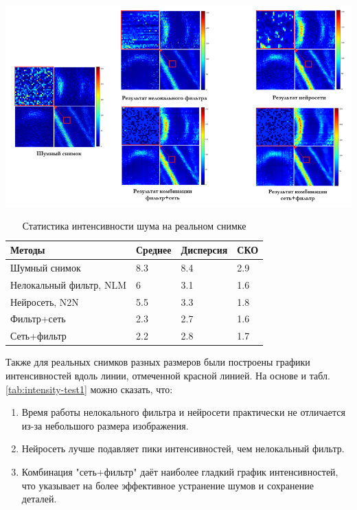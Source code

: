 \begin{minipage}{\textwidth}
	\centering
	\vspace{\mfloatsep} %
	\includegraphics[keepaspectratio=true,scale=0.67] {my_folder/images/denoising/real_colors.png}
	\label{fig:real-segment}  
	\vspace{\mfloatsep} %
\end{minipage}
\begin{table} [H]%
	\centering\small
	\caption{Статистика интенсивности шума на реальном снимке}%
	\label{tab:real-segment}		
	\begin{tabular}{|l|l|l|l|}
		\hline
		Методы&Среднее&Дисперсия&СКО\\
		\hline	
		Шумный снимок
		&8.3&8.4&2.9\\ \hline
		Нелокальный фильтр, NLM
		&6&3.1&1.6\\ \hline
		Нейросеть, N2N&5.5&3.3&1.8\\ \hline
		Фильтр+сеть
		&2.3&2.7&1.6\\ \hline Сеть+фильтр
		&2.2&2.8&1.7\\ \hline			
	\end{tabular}
	\normalsize%
\end{table}
\par Также для реальных снимков разных размеров были построены графики интенсивностей вдоль линии, отмеченной красной линией. На основе  и табл. \ref{tab:intensity-test1} можно сказать, что:
\begin{enumerate}[]
	\item Время работы нелокального фильтра и нейросети практически не отличается из-за небольшого размера изображения.
	\item Нейросеть лучше подавляет пики интенсивностей, чем нелокальный фильтр.
	\item Комбинация "сеть+фильтр" даёт наиболее гладкий график интенсивностей, что указывает на более эффективное устранение шумов и сохранение деталей.
\end{enumerate}
